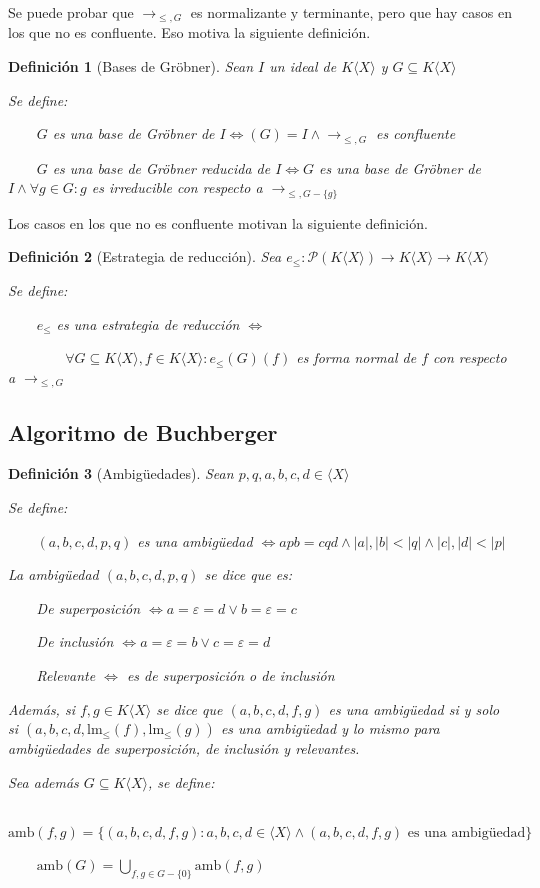 \documentclass{amsbook}
\theoremstyle{customstyle}
\newtheorem{definition}{Definición}[section]
\newcommand{\definición}[2][]{
  \begin{definition}[#1]
  \setlength{\parindent}{2em} %
  #2
  \end{definition}
}
\begin{document}
Se puede probar que $→_{≤, G}$ es normalizante y terminante, pero que hay casos en los que no es confluente. Eso motiva la siguiente definición.

\definición[Bases de Gröbner] {
Sean $I$ un ideal de $K⟨X⟩$ y $G ⊆ K⟨X⟩$

Se define:

    $G$ es una base de Gröbner de $I ⇔ (G) = I ∧ →_{≤, G}$ es confluente

    $G$ es una base de Gröbner reducida de $I ⇔ G$ es una base de Gröbner de $I ∧ ∀g ∈ G : g$ es irreducible con respecto a $→_{≤, G - \{g\}}$

}

Los casos en los que no es confluente motivan la siguiente definición.

\definición[Estrategia de reducción] {
Sea $e_≤ : 𝒫(K⟨X⟩) → K⟨X⟩ → K⟨X⟩$

Se define:

    $e_≤$ es una estrategia de reducción $⇔$

        $∀G ⊆ K⟨X⟩, f ∈ K⟨X⟩ : e_≤(G)(f)$ es forma normal de $f$ con respecto a $→_{≤, G}$

}


\subsection{Algoritmo de Buchberger}

\definición[Ambigüedades] {
Sean $p, q, a, b, c, d ∈ ⟨X⟩$

Se define:

    $(a, b, c, d, p, q)$ es una ambigüedad $ ⇔ apb = cqd ∧ |a|, |b| < |q| ∧ |c|, |d| < |p|$

La ambigüedad $(a, b, c, d, p, q)$ se dice que es:

    De superposición $⇔ a = ε = d ∨ b = ε = c$

    De inclusión $⇔ a = ε = b ∨ c = ε = d$

    Relevante $⇔$ es de superposición o de inclusión

Además, si $f, g ∈ K⟨X⟩$ se dice que $(a, b, c, d, f, g)$ es una ambigüedad si y solo si $(a, b, c, d, \text{lm}_≤{(f)}, \text{lm}_≤{(g)})$ es una ambigüedad y lo mismo para ambigüedades de superposición, de inclusión y relevantes.

Sea además $G ⊆ K⟨X⟩$, se define:

    $\text{amb}(f, g) = \{(a, b, c, d, f, g) : a, b, c, d ∈ ⟨X⟩ ∧ (a, b, c, d, f, g)\text{ es una ambigüedad}\}$

    $\text{amb}(G) = \bigcup_{f, g ∈ G - \{0\}}{\text{amb}(f, g)}$

}
\end{document}
